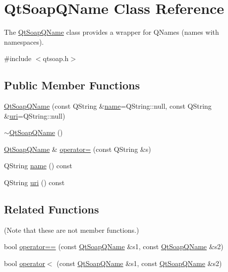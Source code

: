 \hypertarget{class_qt_soap_q_name}{}\section{Qt\+Soap\+Q\+Name Class Reference}
\label{class_qt_soap_q_name}


The \mbox{\hyperlink{class_qt_soap_q_name}{Qt\+Soap\+Q\+Name}} class provides a wrapper for Q\+Names (names with namespaces).  




{\ttfamily \#include $<$qtsoap.\+h$>$}

\subsection*{Public Member Functions}
\begin{DoxyCompactItemize}
\item 
\mbox{\hyperlink{class_qt_soap_q_name_a4a96c28ad8c0ff72a3353048c5414912}{Qt\+Soap\+Q\+Name}} (const Q\+String \&\mbox{\hyperlink{class_qt_soap_q_name_ab788bc414e5709a56e2f8db2403028b7}{name}}=Q\+String\+::null, const Q\+String \&\mbox{\hyperlink{class_qt_soap_q_name_afff764342a9182afa6c67fdf3a193a6b}{uri}}=Q\+String\+::null)
\item 
\mbox{\hyperlink{class_qt_soap_q_name_a24085961dcaebe30f08f2069e00b3d4a}{$\sim$\+Qt\+Soap\+Q\+Name}} ()
\item 
\mbox{\hyperlink{class_qt_soap_q_name}{Qt\+Soap\+Q\+Name}} \& \mbox{\hyperlink{class_qt_soap_q_name_ae0a96da00a45c69fffab0e72a91bda6a}{operator=}} (const Q\+String \&s)
\item 
Q\+String \mbox{\hyperlink{class_qt_soap_q_name_ab788bc414e5709a56e2f8db2403028b7}{name}} () const
\item 
Q\+String \mbox{\hyperlink{class_qt_soap_q_name_afff764342a9182afa6c67fdf3a193a6b}{uri}} () const
\end{DoxyCompactItemize}
\subsection*{Related Functions}
(Note that these are not member functions.) \begin{DoxyCompactItemize}
\item 
bool \mbox{\hyperlink{class_qt_soap_q_name_a92f65e83e578dc8162316a1c1d8fbcf6}{operator==}} (const \mbox{\hyperlink{class_qt_soap_q_name}{Qt\+Soap\+Q\+Name}} \&s1, const \mbox{\hyperlink{class_qt_soap_q_name}{Qt\+Soap\+Q\+Name}} \&s2)
\item 
bool \mbox{\hyperlink{class_qt_soap_q_name_a324bad744351599e14ab87bab8e574a6}{operator$<$}} (const \mbox{\hyperlink{class_qt_soap_q_name}{Qt\+Soap\+Q\+Name}} \&s1, const \mbox{\hyperlink{class_qt_soap_q_name}{Qt\+Soap\+Q\+Name}} \&s2)
\end{DoxyCompactItemize}


